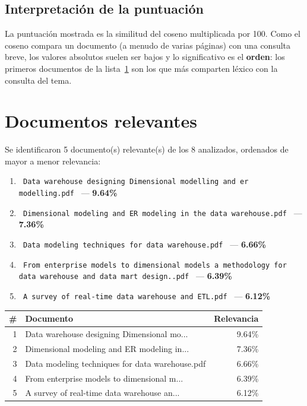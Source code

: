 \documentclass[11pt,a4paper]{article}
\newcommand{\nombrearchivo}[1]{\texttt{#1}}
\newcommand{\pcento}{\%}
\begin{document}
\subsection{Interpretación de la puntuación}

La puntuación mostrada es la similitud del coseno multiplicada por 100. Como
el coseno compara un documento (a menudo de varias páginas) con una consulta
breve, los valores absolutos suelen ser bajos y lo significativo es el
\textbf{orden}: los primeros documentos de la lista~\ref{sec:relevantes} son
los que más comparten léxico con la consulta del tema.

\section{Documentos relevantes}
\label{sec:relevantes}

Se identificaron 5 documento(s) relevante(s) de los
8 analizados, ordenados de mayor a menor relevancia:

\begin{enumerate}
\setlength{\itemsep}{6pt}
\renewcommand{\labelenumi}{\arabic{enumi}.}
  \item \nombrearchivo{ Data warehouse designing Dimensional modelling and er modelling.pdf } --- \textbf{ 9.64\pcento}
  \item \nombrearchivo{ Dimensional modeling and ER modeling in the data warehouse.pdf } --- \textbf{ 7.36\pcento}
  \item \nombrearchivo{ Data modeling techniques for data warehouse.pdf } --- \textbf{ 6.66\pcento}
  \item \nombrearchivo{ From enterprise models to dimensional models a methodology for data warehouse and data mart design..pdf } --- \textbf{ 6.39\pcento}
  \item \nombrearchivo{ A survey of real-time data warehouse and ETL.pdf } --- \textbf{ 6.12\pcento}
\end{enumerate}

\begin{center}
\begin{tabular}{r p{8.5cm} r}
\hline
\textbf{\#} & \textbf{Documento} & \textbf{Relevancia} \\
\hline
1 & Data warehouse designing Dimensional mo... & 9.64\pcento \\
2 & Dimensional modeling and ER modeling in... & 7.36\pcento \\
3 & Data modeling techniques for data warehouse.pdf & 6.66\pcento \\
4 & From enterprise models to dimensional m... & 6.39\pcento \\
5 & A survey of real-time data warehouse an... & 6.12\pcento \\
\hline
\end{tabular}
\end{center}
\end{document}
